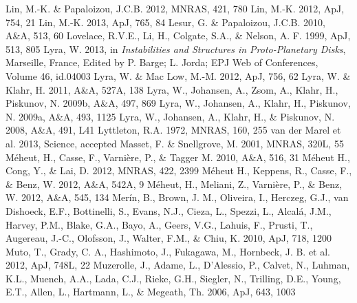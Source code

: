 \documentclass[apj]{emulateapj}
\begin{document}
\begin{thebibliography}{}
 Lin, M.-K. \& Papaloizou, J.C.B. 2012, MNRAS, 421, 780
 Lin, M.-K. 2012, ApJ, 754, 21
 Lin, M.-K. 2013, ApJ, 765, 84
 Lesur, G. \& Papaloizou, J.C.B. 2010, A\&A, 513, 60
 Lovelace, R.V.E., Li, H., Colgate, S.A., \& Nelson, A. F. 1999, ApJ, 513, 805
 Lyra, W. 2013, in {\it Instabilities and Structures in Proto-Planetary Disks}, Marseille, France, Edited by P. Barge; L. Jorda; EPJ Web of Conferences, Volume 46, id.04003 
 Lyra, W. \& Mac Low, M.-M. 2012, ApJ, 756, 62
 Lyra, W. \& Klahr,  H. 2011, A\&A, 527A, 138
 Lyra, W., Johansen, A., Zsom, A., Klahr, H., Piskunov, N. 2009b, A\&A, 497, 869
 Lyra, W., Johansen, A., Klahr, H., Piskunov, N. 2009a, A\&A, 493, 1125 
 Lyra, W., Johansen, A., Klahr, H., \& Piskunov, N. 2008, A\&A, 491, L41
 Lyttleton, R.A. 1972, MNRAS, 160, 255
 van der Marel et al. 2013, Science, accepted
 Masset, F. \& Snellgrove, M. 2001, MNRAS, 320L, 55
 M\'eheut, H., Casse, F., Varni\`ere, P., \& Tagger M. 2010, A\&A, 516, 31
 M\'eheut H., Cong, Y., \& Lai, D. 2012, MNRAS, 422, 2399
 M\'eheut H., Keppens,  R., Casse, F., \& Benz, W. 2012, A\&A, 542A, 9
 M\'eheut, H., Meliani, Z., Varni\`ere, P., \& Benz, W. 2012, A\&A, 545, 134
 Mer\'in, B., Brown, J. M., Oliveira, I., Herczeg, G.J., van Dishoeck, E.F., Bottinelli, S., Evans, N.J., Cieza, L., Spezzi, L., Alcal\'a, J.M., Harvey, P.M., Blake, G.A., Bayo, A., Geers, V.G., Lahuis, F., Prusti, T., Augereau, J.-C., Olofsson, J., Walter, F.M., \& Chiu, K. 2010, ApJ, 718, 1200
 Muto, T., Grady, C. A., Hashimoto, J., Fukagawa, M., Hornbeck, J. B. et al. 2012, ApJ, 748L, 22
 Muzerolle, J., Adame, L., D'Alessio, P., Calvet, N., Luhman, K.L., Muench, A.A., Lada, C.J., Rieke, G.H., Siegler, N., Trilling, D.E., Young, E.T., Allen, L., Hartmann, L., \& Megeath, Th. 2006, ApJ, 643, 1003

\end{thebibliography}
\end{document}
